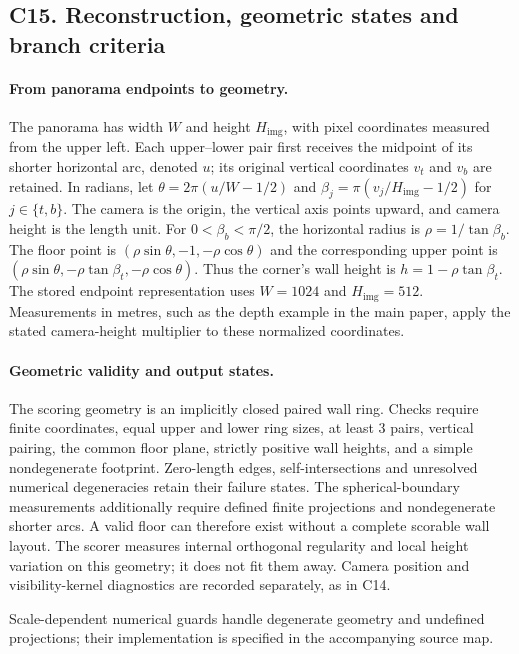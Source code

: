 \clearpage
\subsection*{C15. Reconstruction, geometric states and branch criteria}

\paragraph{From panorama endpoints to geometry.}
The panorama has width $W$ and height $H_{\mathrm{img}}$, with pixel coordinates
measured from the upper left. Each upper--lower pair first receives the
midpoint of its shorter horizontal arc, denoted $u$; its original vertical
coordinates $v_t$ and $v_b$ are retained. In radians, let
$\theta=2\pi(u/W-1/2)$ and
$\beta_j=\pi(v_j/H_{\mathrm{img}}-1/2)$ for $j\in\{t,b\}$.
The camera is the origin, the vertical axis points upward, and camera height
is the length unit. For $0<\beta_b<\pi/2$, the horizontal radius is
$\rho=1/\tan\beta_b$. The floor point is
$(\rho\sin\theta,-1,-\rho\cos\theta)$ and the corresponding upper point is
$(\rho\sin\theta,-\rho\tan\beta_t,-\rho\cos\theta)$.
Thus the corner's wall height is $h=1-\rho\tan\beta_t$.
The stored endpoint representation uses $W=1024$ and $H_{\mathrm{img}}=512$.
Measurements in metres, such as the depth example in the main paper, apply
the stated camera-height multiplier to these normalized coordinates.

\paragraph{Geometric validity and output states.}
The scoring geometry is an implicitly closed paired wall ring. Checks require
finite coordinates, equal upper and lower ring sizes, at least 3 pairs,
vertical pairing, the common floor plane, strictly positive wall heights,
and a simple nondegenerate footprint. Zero-length edges, self-intersections
and unresolved numerical degeneracies retain their failure states.
The spherical-boundary measurements additionally require defined finite
projections and nondegenerate shorter arcs. A valid floor can therefore
exist without a complete scorable wall layout. The scorer measures internal
orthogonal regularity and local height variation on this geometry; it does
not fit them away. Camera position and visibility-kernel diagnostics are
recorded separately, as in C14.

Scale-dependent numerical guards handle degenerate geometry and undefined projections; their implementation is specified in the accompanying source map.

